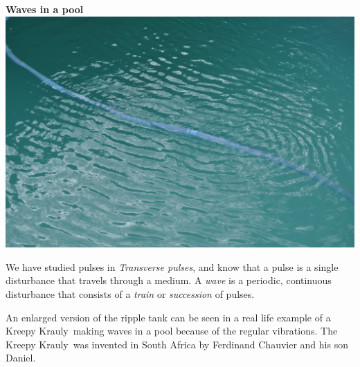             \nopagebreak
\begin{minipage}{.5\textwidth}
\begin{center}
\textbf{Waves in a pool}\\
 \includegraphics[width=.8\textwidth]{photos/kreepykrawly.jpg}
\end{center}
\end{minipage}
\begin{minipage}{.5\textwidth}      
\label{m38806*id317690}We have studied pulses in \textit{Transverse pulses}, and know that a pulse is a single disturbance that travels through a medium. A \textsl{wave} is a periodic, continuous disturbance that consists of a \textsl{train} or \textsl{succession} of pulses.\par 
An enlarged version of the ripple tank can be seen in a real life example of a Kreepy Krauly\textregistered\ making waves in a pool because of the regular vibrations. The Kreepy Krauly\textregistered\ was invented in South Africa by Ferdinand Chauvier and his son Daniel.
\end{minipage}


